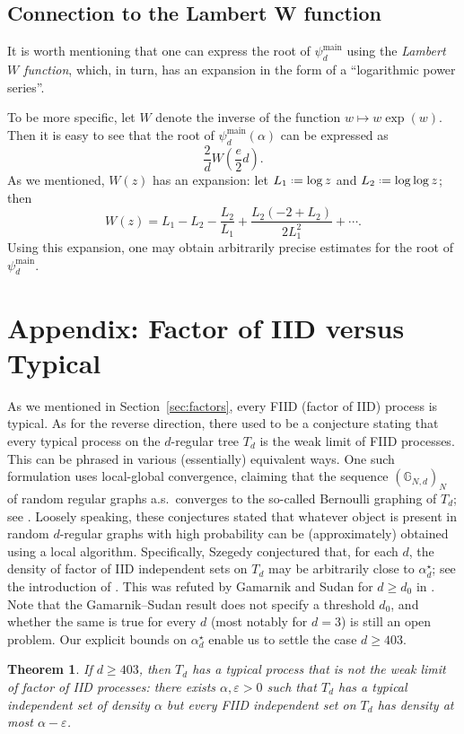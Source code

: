 \documentclass[12pt]{amsart}
\newtheorem{theorem}{Theorem}[section]
\theoremstyle{definition}
\newcommand\Gb{\mathbb{G}}
\newcommand\al{\alpha}
\newcommand\eps{\varepsilon}
\newcommand\alstar{\alpha^{\star}}
\newcommand\psimain{\psi^{\mathrm{main}}}
\newcommand{\defeq}{\mathrel{\vcenter{\baselineskip0.5ex \lineskiplimit0pt
                     \hbox{\scriptsize.}\hbox{\scriptsize.}}}%
                     =}
\begin{document}
%
\subsection{Connection to the Lambert W function}
%
It is worth mentioning that one can express the root of $\psimain_d$ using the \emph{Lambert $W$ function}, which, in turn, has an expansion in the form of a ``logarithmic power series''. 

To be more specific, let $W$ denote the inverse of the function $w \mapsto w \exp(w)$. Then it is easy to see that the root of $\psimain_d(\al)$ can be expressed as
%
\[ \frac{2}{d} W\left( \frac{e}{2} d \right) .\]
%
As we mentioned, $W(z)$ has an expansion: let 
$L_1 \defeq \log z$ and $L_2 \defeq \log\log z$; then 
%
\[ W(z) = L_1 - L_2 - \frac{L_2}{L_1} 
+ \frac{L_2(-2+L_2)}{2L_1^2} + \cdots .\]
%
Using this expansion, one may obtain arbitrarily precise estimates for the root of $\psimain_d$. 
%

\newpage

\section{Appendix: Factor of IID versus Typical} 
\label{sec:FIID_vs_typical}

As we mentioned in Section~\ref{sec:factors}, every FIID (factor of IID) process is typical. As for the reverse direction, there used to be a conjecture stating that every typical process on the $d$-regular tree $T_d$ is the weak limit of FIID processes. This can be phrased in various (essentially) equivalent ways. One such formulation uses local-global convergence, claiming that the sequence $(\Gb_{N,d})_N$ of random regular graphs a.s.~converges to the so-called Bernoulli graphing of $T_d$; see \cite[Section 7]{hatami2014limits}. Loosely speaking, these conjectures stated that whatever object is present in random $d$-regular graphs with high probability can be (approximately) obtained using a local algorithm. Specifically, Szegedy conjectured that, for each $d$, the density of factor of IID independent sets on $T_d$ may be arbitrarily close to $\alstar_d$; see the introduction of \cite{lyons2011perfect}. This was refuted by Gamarnik and Sudan for $d \geq d_0$ in \cite{gamarnik2017limits}. Note that the Gamarnik--Sudan result does not specify a threshold $d_0$, and whether the same is true for every $d$ (most notably for $d=3$) is still an open problem. Our explicit bounds on $\alstar_d$ enable us to settle the case $d \geq 403$.
%
\begin{theorem} \label{thm:fiid_ind_set}
If $d \geq 403$, then $T_d$ has a typical process that is not the weak limit of factor of IID processes: there exists $\al,\eps>0$ such that $T_d$ has a typical independent set of density $\al$ but every FIID independent set on $T_d$ has density at most $\al-\eps$.  
\end{theorem}
%
\end{document}
